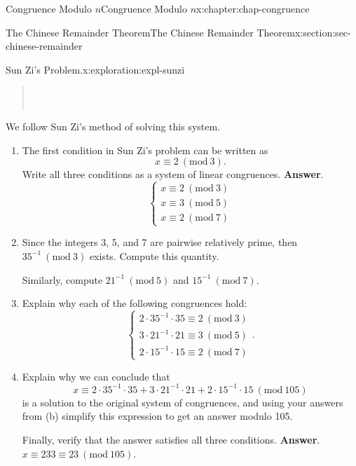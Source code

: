 \documentclass[oneside,10pt,]{book}
\newcommand{\blocktitlefont}{\relax}
\numberwithin{equation}{section}
\newcommand{\Mod}[1]{\ \left(\mathrm{mod}\ #1\right)}
\begin{document}
\begin{chapterptx}{Congruence Modulo \(n\)}{}{Congruence Modulo \(n\)}{}{}{x:chapter:chap-congruence}
\begin{sectionptx}{The Chinese Remainder Theorem}{}{The Chinese Remainder Theorem}{}{}{x:section:sec-chinese-remainder}
\begin{exploration}{Sun Zi's Problem.}{x:exploration:expl-sunzi}
\begin{quote}
{\begin{tabular}[t]{l@{}}
\end{tabular}}\\\par
\end{quote}
We follow Sun Zi's method of solving this system.%
\begin{enumerate}[font=\bfseries,label=(\alph*),ref=\alph*]
\item{}The first condition in Sun Zi's problem can be written as%
\begin{equation*}
x \equiv 2 \Mod{3}\text{.}
\end{equation*}
Write all three conditions as a system of linear congruences.%
\textbf{\blocktitlefont Answer}.\hypertarget{g:answer:id454435}{}\quad{}%
\begin{equation*}
\begin{cases} x \equiv 2 \Mod{3} \\ x \equiv 3 \Mod{5} \\ x \equiv 2 \Mod{7} \end{cases}
\end{equation*}
%
\item{}Since the integers 3, 5, and 7 are pairwise relatively prime, then \(35^{-1} \Mod{3}\) exists. Compute this quantity.%
\par
Similarly, compute \(21^{-1} \Mod{5}\) and \(15^{-1} \Mod{7}\).%
\item{}Explain why each of the following congruences hold:%
\begin{equation*}
\begin{cases} 2 \cdot 35^{-1} \cdot 35 \equiv 2 \Mod{3} \\ 3 \cdot 21^{-1} \cdot 21 \equiv 3 \Mod{5} \\ 2 \cdot 15^{-1} \cdot 15 \equiv 2 \Mod{7} \end{cases}\text{.}
\end{equation*}
%
\item{}Explain why we can conclude that%
\begin{equation*}
x \equiv 2 \cdot 35^{-1} \cdot 35 + 3 \cdot 21^{-1} \cdot 21 + 2 \cdot 15^{-1} \cdot 15 \Mod{105}
\end{equation*}
is a solution to the original system of congruences, and using your answers from (b) simplify this expression to get an answer modulo 105.%
\par
Finally, verify that the answer satisfies all three conditions.%
\textbf{\blocktitlefont Answer}.\hypertarget{g:answer:id454453}{}\quad{}\(x \equiv 233 \equiv 23 \Mod{105}\).%
\end{enumerate}

\end{exploration}
\end{sectionptx}
\end{chapterptx}
\end{document}
